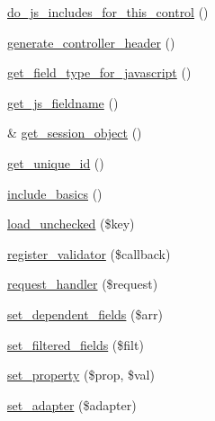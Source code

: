 \begin{DoxyCompactItemize}
\item 
\hyperlink{class_ac_field_afe52ff2e5403fdb103f85ddf4da6def8}{do\-\_\-js\-\_\-includes\-\_\-for\-\_\-this\-\_\-control} ()
\item 
\hyperlink{class_ac_field_a39df382f51a78ec925d8c3fb18d174c0}{generate\-\_\-controller\-\_\-header} ()
\item 
\hyperlink{class_ac_field_a4bffcad348a63a2825136b2fa39fe849}{get\-\_\-field\-\_\-type\-\_\-for\-\_\-javascript} ()
\item 
\hyperlink{class_ac_field_aa7221cb809c551756a9ea4b364331cb9}{get\-\_\-js\-\_\-fieldname} ()
\item 
\& \hyperlink{class_ac_field_a824268713fde8c57ce7e29b5078ce953}{get\-\_\-session\-\_\-object} ()
\item 
\hyperlink{class_ac_field_ae24cbcac1e9fc2ec05e5e10aa0479e47}{get\-\_\-unique\-\_\-id} ()
\item 
\hyperlink{class_ac_field_a22e5c3d5dbb4f0d63dcbf1e297006ce5}{include\-\_\-basics} ()
\item 
\hyperlink{class_ac_field_aad78a1a963d349ae07374b10f062a710}{load\-\_\-unchecked} (\$key)
\item 
\hyperlink{class_ac_field_a00e9ebf2d2441f6840278b402bc04b45}{register\-\_\-validator} (\$callback)
\item 
\hyperlink{class_ac_field_abde3fea649f4e1db70a5f2bcf45e42db}{request\-\_\-handler} (\$request)
\item 
\hyperlink{class_ac_field_a6e3ec2564c35b5a8cfe4683abf4d2b14}{set\-\_\-dependent\-\_\-fields} (\$arr)
\item 
\hyperlink{class_ac_field_a901c77ca5420e8b4cc6ddbf00e81283c}{set\-\_\-filtered\-\_\-fields} (\$filt)
\item 
\hyperlink{class_ac_field_a7065aa5c38630b67bf65c374a3405fd7}{set\-\_\-property} (\$prop, \$val)
\item 
\hyperlink{class_ac_field_a8abe378bc69c9dbaaeff3d8fd7f7e8ae}{set\-\_\-adapter} (\$adapter)
\end{DoxyCompactItemize}
